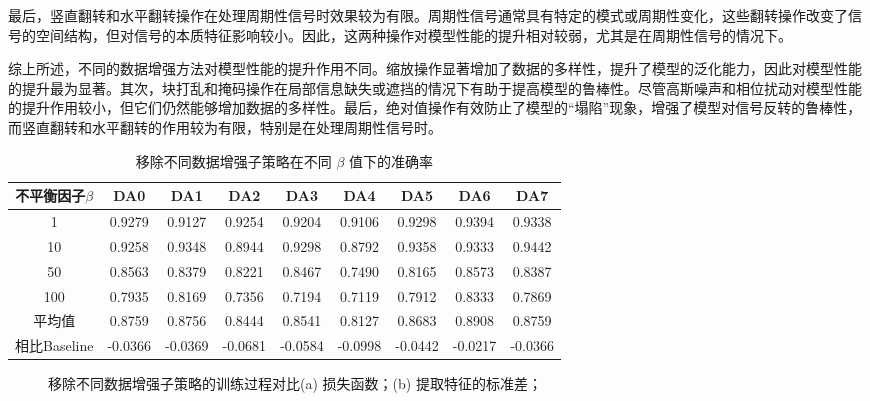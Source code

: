 \documentclass[master]{thesis-uestc}
\begin{document}
最后，竖直翻转和水平翻转操作在处理周期性信号时效果较为有限。周期性信号通常具有特定的模式或周期性变化，这些翻转操作改变了信号的空间结构，但对信号的本质特征影响较小。因此，这两种操作对模型性能的提升相对较弱，尤其是在周期性信号的情况下。

综上所述，不同的数据增强方法对模型性能的提升作用不同。缩放操作显著增加了数据的多样性，提升了模型的泛化能力，因此对模型性能的提升最为显著。其次，块打乱和掩码操作在局部信息缺失或遮挡的情况下有助于提高模型的鲁棒性。尽管高斯噪声和相位扰动对模型性能的提升作用较小，但它们仍然能够增加数据的多样性。最后，绝对值操作有效防止了模型的“塌陷”现象，增强了模型对信号反转的鲁棒性，而竖直翻转和水平翻转的作用较为有限，特别是在处理周期性信号时。

\begin{table}
    \caption{移除不同数据增强子策略在不同 $\beta$ 值下的准确率}
    \centering
    \begin{tabular}{ccccccccc}
    \toprule
    不平衡因子$\beta$  & DA0 & DA1 & DA2 & DA3 & DA4 & DA5 & DA6 & DA7 \\
    \midrule
    1   & 0.9279  & 0.9127 & 0.9254 & 0.9204 & 0.9106 & 0.9298 & 0.9394 & 0.9338  \\
    10  & 0.9258  & 0.9348 & 0.8944 & 0.9298 & 0.8792 & 0.9358 & 0.9333 & 0.9442  \\
    50  & 0.8563  & 0.8379 & 0.8221 & 0.8467 & 0.7490 & 0.8165 & 0.8573 & 0.8387  \\
    100 & 0.7935  & 0.8169 & 0.7356 & 0.7194 & 0.7119 & 0.7912 & 0.8333 & 0.7869  \\
    \midrule
    平均值 & 0.8759 & 0.8756 & 0.8444 & 0.8541 & 0.8127 & 0.8683 & 0.8908 & 0.8759 \\
    \midrule
    相比Baseline & -0.0366 & -0.0369 & -0.0681 & -0.0584 & -0.0998 & -0.0442 & -0.0217 & -0.0366 \\
    \bottomrule
    \end{tabular}
    \label{tb:da_discuss_results}
\end{table}

\begin{figure}[h]
    \centering
    \caption{移除不同数据增强子策略的训练过程对比(a) 损失函数；(b) 提取特征的标准差；}
    \label{train_process_da_discuss}
\end{figure}
\end{document}
